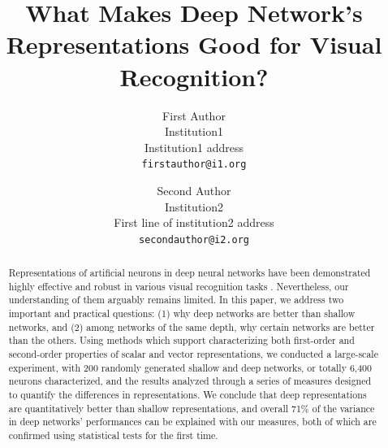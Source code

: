\documentclass[10pt,twocolumn,letterpaper]{article}
\begin{document}
\title{What Makes Deep Network's Representations Good for Visual Recognition?}

\author{First Author\\
Institution1\\
Institution1 address\\
{\tt\small firstauthor@i1.org}
\and
Second Author\\
Institution2\\
First line of institution2 address\\
{\tt\small secondauthor@i2.org}
}

\maketitle

\begin{abstract}

Representations of artificial neurons in deep neural networks have been demonstrated highly effective and robust in various visual recognition tasks \cite{krizhevsky2012imagenet, sermanet2013overfeat, donahue2014decaf}.
Nevertheless, our understanding of them arguably remains limited.
In this paper, we address two important and practical questions: (1) why deep networks are better than shallow networks, and (2) among networks of the same depth, why certain networks are better than the others.
Using methods which support characterizing both first-order and second-order properties of scalar and vector representations, we conducted a large-scale experiment, with 200 randomly generated shallow and deep networks, or totally 6,400 neurons characterized, and the results analyzed through a series of measures designed to quantify the differences in representations. 
We conclude that deep representations are quantitatively better than shallow representations, and overall 71\% of the variance in deep networks' performances can be explained with our measures, both of which are confirmed using statistical tests for the first time.


\end{abstract}
\end{document}
